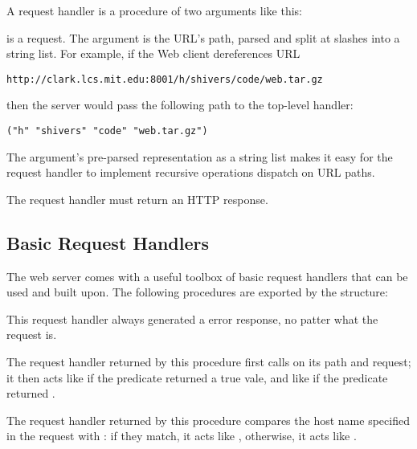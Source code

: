A request handler is a procedure of two arguments like this:
\begin{desc}
   is a request. The  argument is the URL's
  path, parsed and split at slashes into a string list. For example,
  if the Web client dereferences URL
\begin{verbatim}
http://clark.lcs.mit.edu:8001/h/shivers/code/web.tar.gz
\end{verbatim}
  then the server would pass the following path to the top-level
  handler:
\begin{verbatim}
("h" "shivers" "code" "web.tar.gz")
\end{verbatim}
  The  argument's pre-parsed representation as a string
  list makes it easy for the request handler to implement recursive
  operations dispatch on URL paths.

  The request handler must return an HTTP response.
\end{desc}

\subsection{Basic Request Handlers}
 
The web server comes with a useful toolbox of basic request handlers
that can be used and built upon.  The following procedures are
exported by the  structure:

\begin{desc}
  This request handler always generated a  error
  response, no patter what the request is.
\end{desc}

\begin{desc}
  The request handler returned by this procedure first calls
   on its path and request; it then acts like
   if the predicate returned a true vale, and like
   if the predicate returned \sharpf.
\end{desc}

\begin{desc}
  The request handler returned by this procedure compares the host
  name specified in the request with : if they match, it
  acts like , otherwise, it acts like
  .
\end{desc}

